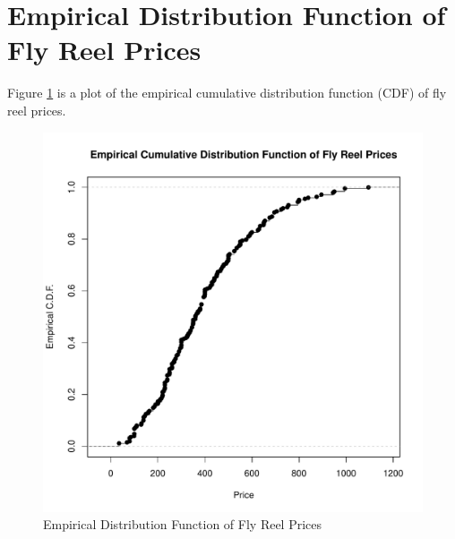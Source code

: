 %
%
%
%
%





\section{Empirical Distribution Function of Fly Reel Prices}

Figure \ref{fig:ecdf_prices} is 
a plot of the empirical cumulative distribution function (CDF) of fly reel prices. 


\begin{figure}[h!]
  \centering
  \includegraphics[scale = 0.5, keepaspectratio=true]{../Figures/ecdf_prices}
  \caption{Empirical Distribution Function of Fly Reel Prices} \label{fig:ecdf_prices}
\end{figure}


